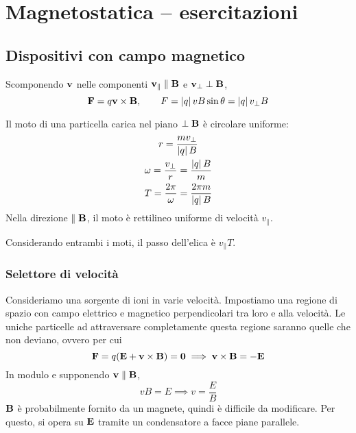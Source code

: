 \chapter{Magnetostatica -- esercitazioni}

\section{Dispositivi con campo magnetico}

Scomponendo $\mathbf{v}$ nelle componenti $\mathbf{v}_\parallel \parallel \mathbf{B}$ e $\mathbf{v}_\perp \perp \mathbf{B}$,
\begin{equation}
    \mathbf{F} = q\mathbf{v} \times \mathbf{B}, \qquad
    F = \left\lvert q \right\rvert vB \sin\theta = \left\lvert q \right\rvert v_\perp B
\end{equation}

Il moto di una particella carica nel piano $\perp \mathbf{B}$ è circolare uniforme:
\begin{subequations}
\begin{gather}
    r = \frac{m v_\perp}{\left\lvert q \right\rvert B} \\
    \omega = \frac{v_\perp}{r} = \frac{\left\lvert q \right\rvert B}{m} \\
    T = \frac{2\pi}{\omega} = \frac{2\pi m}{\left\lvert q \right\rvert B}
\end{gather}
\end{subequations}
Nella direzione $\parallel \mathbf{B}$, il moto è rettilineo uniforme di velocità $v_\parallel$.

Considerando entrambi i moti, il passo dell'elica è $v_\parallel T$.



\subsection{Selettore di velocità}

Consideriamo una sorgente di ioni in varie velocità.
Impostiamo una regione di spazio con campo elettrico e magnetico perpendicolari tra loro e alla velocità.
Le uniche particelle ad attraversare completamente questa regione saranno quelle che non deviano, ovvero per cui
\begin{equation}
    \mathbf{F} = q(\mathbf{E} + \mathbf{v} \times \mathbf{B}) = \mathbf{0}
    \implies \mathbf{v} \times \mathbf{B} = - \mathbf{E}
\end{equation}
In modulo e supponendo $\mathbf{v} \parallel \mathbf{B}$,
\begin{equation}
    vB = E \implies v = \frac{E}{B}
\end{equation}
$\mathbf{B}$ è probabilmente fornito da un magnete, quindi è difficile da modificare.
Per questo, si opera su $\mathbf{E}$ tramite un condensatore a facce piane parallele.

